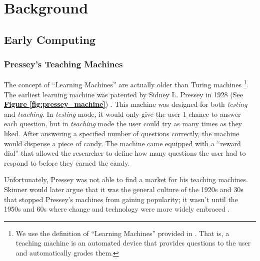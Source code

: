 \chapter{Background}
\section{Early Computing}

\subsection{Pressey's Teaching Machines}

\par The concept of ``Learning Machines'' are actually older than Turing machines \footnote{We use the definition of ``Learning Machines'' provided in \cite{benjamin1988history}. That is, a teaching machine is an automated device that provides questions to the user and automatically grades them.}. The earliest learning machine was patented by Sidney L. Pressey in 1928 (See \textbf{\hyperref[fig:pressey_machine]{Figure \ref*{fig:pressey_machine}}}) \cite{benjamin1988history}. This machine was designed for both \textit{testing} and \textit{teaching}. In \textit{testing} mode, it would only give the user 1 chance to answer each question, but in \textit{teaching} mode the user could try as many times as they liked. After answering a specified number of questions correctly, the machine would dispense a piece of candy. The machine came equipped with a ``reward dial'' that allowed the researcher to define how many questions the user had to respond to before they earned the candy.

\par Unfortunately, Pressey was not able to find a market for his teaching machines. Skinner would later argue that it was the general culture of the 1920s and 30s that stopped Pressey's machines from gaining popularity; it wasn't until the 1950s and 60s where change and technology were more widely embraced \cite{skinner1958teaching}.

